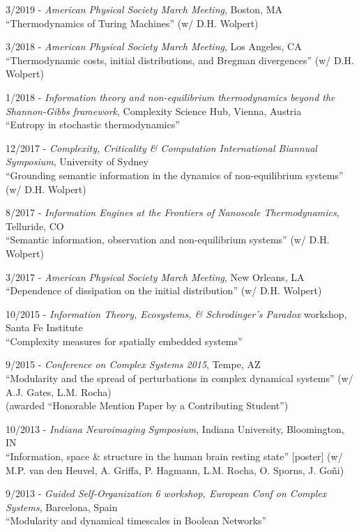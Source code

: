 \documentclass[margin,line,centered]{res}
\begin{document}
\begin{resume}
3/2019 - \emph{American Physical Society March Meeting}, Boston, MA\\
``Thermodynamics of Turing Machines'' (w/ D.H. Wolpert)%

3/2018 - \emph{American Physical Society March Meeting}, Los Angeles, CA\\
``Thermodynamic costs, initial distributions, and Bregman divergences'' (w/ D.H. Wolpert)%

1/2018 - \emph{Information theory and non-equilibrium thermodynamics beyond the Shannon-Gibbs framework}, Complexity Science Hub, Vienna, Austria\\
``Entropy in stochastic thermodynamics''

12/2017 - \emph{Complexity, Criticality \& Computation International Biannual Symposium}, University of Sydney\\
``Grounding semantic information in the dynamics of non-equilibrium systems'' (w/ D.H. Wolpert)

8/2017 - \emph{Information Engines at the Frontiers of Nanoscale Thermodynamics}, Telluride, CO\\
``Semantic information, observation and non-equilibrium systems'' (w/ D.H. Wolpert) %

3/2017 - \emph{American Physical Society March Meeting}, New Orleans, LA\\
``Dependence of dissipation on the initial distribution'' (w/ D.H. Wolpert)%

10/2015 - \emph{Information Theory, Ecosystems, \& Schrodinger's Paradox} workshop, Santa Fe Institute\\
``Complexity measures for spatially embedded systems''

9/2015 - \emph{Conference on Complex Systems 2015}, Tempe, AZ\\
``Modularity and the spread of perturbations in complex dynamical systems'' (w/ A.J. Gates, L.M. Rocha)\\
(awarded ``Honorable Mention Paper by a Contributing Student'')

10/2013 - \emph{Indiana Neuroimaging Symposium}, Indiana University, Bloomington, IN\\
``Information, space \& structure in the human brain resting state'' [poster] (w/ M.P. van den Heuvel, A. Griffa, P. Hagmann, L.M. Rocha, O. Sporns, J. Goñi)

9/2013 - \emph{Guided Self-Organization 6 workshop, European Conf on Complex Systems}, Barcelona, Spain\\
``Modularity and dynamical timescales in Boolean Networks'' %


\end{resume}
\end{document}
